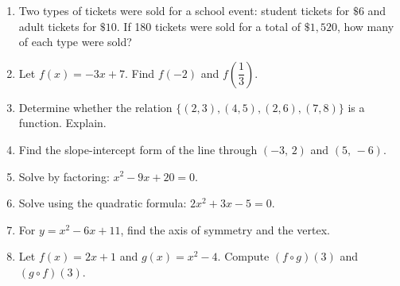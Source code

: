 \documentclass[11pt]{article}
\begin{document}
\begin{enumerate}
\item Two types of tickets were sold for a school event: student tickets for $\$6$ and adult tickets for $\$10$. If 180 tickets were sold for a total of $\$1{,}520$, how many of each type were sold?

\item Let $f(x) = -3x + 7$. Find $f(-2)$ and $f\!\left(\dfrac{1}{3}\right)$.

\item Determine whether the relation $\{(2,3), (4,5), (2,6), (7,8)\}$ is a function. Explain.

\item Find the slope-intercept form of the line through $( -3,\, 2)$ and $(5,\, -6)$.

\item Solve by factoring: $x^2 - 9x + 20 = 0$.

\item Solve using the quadratic formula: $2x^2 + 3x - 5 = 0$.

\item For $y = x^2 - 6x + 11$, find the axis of symmetry and the vertex.

\item Let $f(x)=2x+1$ and $g(x)=x^2-4$. Compute $(f\circ g)(3)$ and $(g\circ f)(3)$.

\end{enumerate}

\newpage
\end{document}
